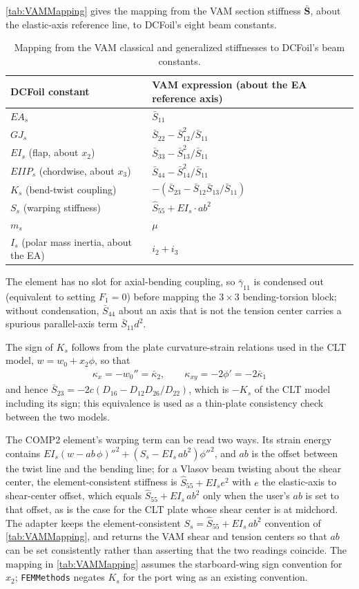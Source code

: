 \documentclass[10pt]{article}
\newcommand{\mbf}[1]{\mathbf{#1}}
\newcommand{\beq}{\begin{equation}\begin{aligned}}
\newcommand{\eeq}{\end{aligned}\end{equation}}
\begin{document}
\autoref{tab:VAMMapping} gives the mapping from the VAM section stiffness $\bar{\mbf{S}}$, about the elastic-axis reference line, to DCFoil's eight beam constants.
\begin{table}[H]
\centering
\caption{Mapping from the VAM classical and generalized stiffnesses to DCFoil's beam constants.}
\label{tab:VAMMapping}
\begin{tabular}{ll}
DCFoil constant & VAM expression (about the \ac{EA} reference axis) \\
\midrule
$EA_s$ & $\bar S_{11}$ \\
$GJ_s$ & $\bar S_{22} - \bar S_{12}^2/\bar S_{11}$ \\
$EI_s$ (flap, about $x_2$) & $\bar S_{33} - \bar S_{13}^2/\bar S_{11}$ \\
$EIIP_s$ (chordwise, about $x_3$) & $\bar S_{44} - \bar S_{14}^2/\bar S_{11}$ \\
$K_s$ (bend-twist coupling) & $-\left(\bar S_{23} - \bar S_{12}\bar S_{13}/\bar S_{11}\right)$ \\
$S_s$ (warping stiffness) & $\hat S_{55} + EI_s \cdot ab^2$ \\
$m_s$ & $\mu$ \\
$I_s$ (polar mass inertia, about the \ac{EA}) & $i_2 + i_3$ \\
\end{tabular}
\end{table}
The element has no slot for axial-bending coupling, so $\bar\gamma_{11}$ is condensed out (equivalent to setting $F_1 = 0$) before mapping the $3\times3$ bending-torsion block; without condensation, $\bar S_{44}$ about an axis that is not the tension center carries a spurious parallel-axis term $\bar S_{11}d^2$.

The sign of $K_s$ follows from the plate curvature-strain relations used in the \ac{CLT} model, $w = w_0 + x_2\phi$, so that
\beq
\kappa_x = -w_0'' = \bar\kappa_2, \qquad \kappa_{xy} = -2\phi' = -2\bar\kappa_1
\label{eqn:VAMCurvatureCheck}
\eeq
and hence $\bar S_{23} = -2c(D_{16} - D_{12}D_{26}/D_{22})$, which is $-K_s$ of the \ac{CLT} model including its sign; this equivalence is used as a thin-plate consistency check between the two models.

The COMP2 element's warping term can be read two ways.
Its strain energy contains $EI_s(w-ab\,\phi)''^2 + (S_s - EI_s\,ab^2)\phi''^2$, and $ab$ is the offset between the twist line and the bending line; for a Vlasov beam twisting about the shear center, the element-consistent stiffness is $\hat S_{55} + EI_s e^2$ with $e$ the elastic-axis to shear-center offset, which equals $\hat S_{55} + EI_s\, ab^2$ only when the user's $ab$ is set to that offset, as is the case for the \ac{CLT} plate whose shear center is at midchord.
The adapter keeps the element-consistent $S_s = \hat S_{55} + EI_s\, ab^2$ convention of \autoref{tab:VAMMapping}, and returns the VAM shear and tension centers so that $ab$ can be set consistently rather than asserting that the two readings coincide.
The mapping in \autoref{tab:VAMMapping} assumes the starboard-wing sign convention for $x_2$; \texttt{FEMMethods} negates $K_s$ for the port wing as an existing convention.
\end{document}
